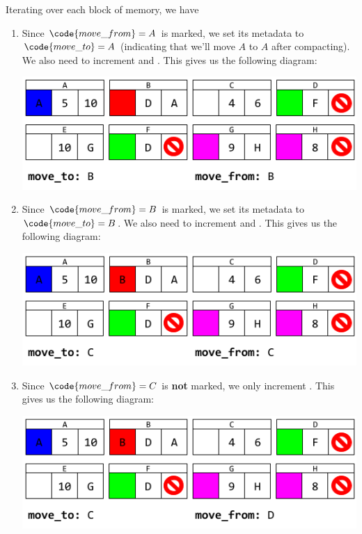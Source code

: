 Iterating over each block of memory, we have 
\begin{enumerate}
    \item Since $\code{move\_from} = A$ is marked, we set its metadata to $\code{move\_to} = A$ (indicating that we'll move $A$ to $A$ after compacting). We also need to increment  and . This gives us the following diagram: 
    \begin{center}
        \includegraphics[scale=0.6]{assets/GCAlg3_1.png}
    \end{center}

    \item Since $\code{move\_from} = B$ is marked, we set its metadata to $\code{move\_to} = B$. We also need to increment  and . This gives us the following diagram: 
    \begin{center}
        \includegraphics[scale=0.6]{assets/GCAlg3_2.png}
    \end{center}

    \item Since $\code{move\_from} = C$ is \textbf{not} marked, we only increment . This gives us the following diagram: 
    \begin{center}
        \includegraphics[scale=0.6]{assets/GCAlg3_3.png}
    \end{center}


\end{enumerate}
